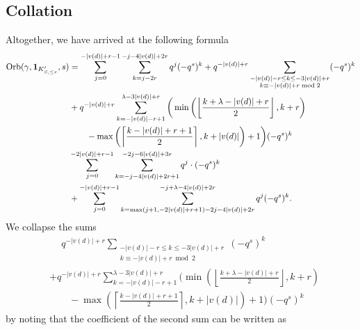 \subsection{Collation}
Altogether, we have arrived at the following formula
\begin{align*}
  \operatorname{Orb}(\gamma, \mathbf{1}_{K'_{S, \le r}}, s)
  &= \sum_{j=0}^{-|v(d)|+r-1} \sum_{k = j - 2r}^{-j - 4|v(d)| + 2r} q^j (-q^s)^k
  + q^{-|v(d)|+r} \sum_{\substack{-|v(d)|-r \le k \le -3|v(d)|+r \\ k \equiv -|v(d)|+r \bmod 2}}
    (-q^s)^k \\
  &+ q^{-|v(d)|+r} \sum_{k=-|v(d)|-r+1}^{\lambda-3|v(d)|+r}
  \bigg( \min\left( \left\lfloor \frac{k+\lambda-|v(d)|+r}{2} \right\rfloor, k+r \right) \\
    &\qquad - \max\left( \left\lceil \frac{k-|v(d)|+r+1}{2} \right\rceil, k+|v(d)| \right) + 1 \bigg)
    (-q^s)^k \\
  &\sum_{j=0}^{-2|v(d)|+r-1}
    \sum_{k=-j-4|v(d)|+2r+1}^{-2j-6|v(d)|+3r}
    q^j \cdot (-q^s)^k \\
  &+ \sum_{j=0}^{-|v(d)|+r-1}
    \sum_{k=\max(j+1, -2|v(d)|+r+1) - 2j - 4|v(d)| + 2r}^{-j+\lambda-4|v(d)|+2r}
    q^j (-q^s)^k.
\end{align*}
We collapse the sums
\begin{align*}
  &\phantom+ q^{-|v(d)|+r} \sum_{\substack{-|v(d)|-r \le k \le -3|v(d)|+r \\ k \equiv -|v(d)|+r \bmod 2}}
    (-q^s)^k \\
  &+ q^{-|v(d)|+r} \sum_{k=-|v(d)|-r+1}^{\lambda-3|v(d)|+r}
  \bigg( \min\left( \left\lfloor \frac{k+\lambda-|v(d)|+r}{2} \right\rfloor, k+r \right) \\
    &\qquad - \max\left( \left\lceil \frac{k-|v(d)|+r+1}{2} \right\rceil, k+|v(d)| \right) + 1 \bigg)
    (-q^s)^k
\end{align*}
by noting that the coefficient of the second sum can be written as
